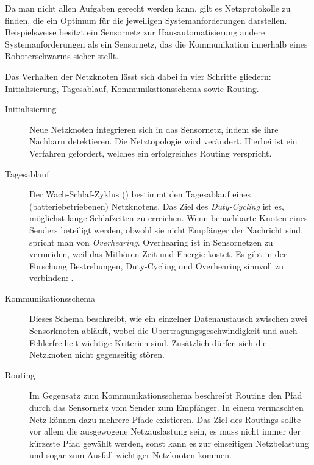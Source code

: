 	Da man nicht allen Aufgaben gerecht werden kann, gilt es Netzprotokolle
	zu finden, die ein Optimum für die jeweiligen Systemanforderungen
	darstellen.  Beispielsweise besitzt ein Sensornetz zur
	Hausautomatisierung andere Systemanforderungen als ein Sensornetz, das
	die Kommunikation innerhalb eines Roboterschwarms sicher stellt.

	Das Verhalten der Netzknoten lässt sich dabei in vier Schritte
	gliedern: Initialisierung, Tagesablauf, Kommunikationsschema sowie
	Routing.

	\begin{description}

	\item[Initialisierung]
		Neue Netzknoten integrieren sich in das Sensornetz, indem
		sie ihre Nachbarn detektieren. Die Netztopologie wird verändert.
		Hierbei ist ein Verfahren gefordert, welches ein erfolgreiches Routing
		verspricht.

	\item[Tagesablauf]
		Der Wach-Schlaf-Zyklus () bestimmt
		den Tagesablauf eines (batteriebetriebenen) Netzknotens.
		Das Ziel des \emph{Duty-Cycling} ist es,
		möglichst lange Schlafzeiten zu erreichen.
		Wenn benachbarte Knoten eines Senders beteiligt werden,
		obwohl sie nicht Empfänger der Nachricht sind,
		spricht man von \emph{Overhearing}.
		Overhearing ist in Sensornetzen zu vermeiden, weil das Mithören
		Zeit und Energie kostet. Es gibt in der Forschung Bestrebungen,
		Duty-Cycling und Overhearing sinnvoll zu verbinden:
		 \autocite{Thesis:VereinbarkeitRDCOverhearing}.

	\item[Kommunikationsschema]
		Dieses Schema beschreibt, wie ein einzelner Datenaustausch zwischen
		zwei Sensorknoten abläuft, wobei die Übertragungsgeschwindigkeit
		und auch Fehlerfreiheit wichtige Kriterien sind. Zusätzlich dürfen sich
		die Netzknoten nicht gegenseitig stören.

	\item[Routing]
		Im Gegensatz zum Kommunikationsschema beschreibt Routing den Pfad durch das
		Sensornetz vom Sender zum Empfänger. In einem vermaschten Netz können dazu
		mehrere Pfade existieren. Das Ziel des Routings sollte vor allem die
		ausgewogene Netzauslastung sein, \dhx es muss nicht immer der kürzeste Pfad
		gewählt werden, sonst kann es zur einseitigen Netzbelastung und sogar zum
		Ausfall wichtiger Netzknoten kommen.

	\end{description}

